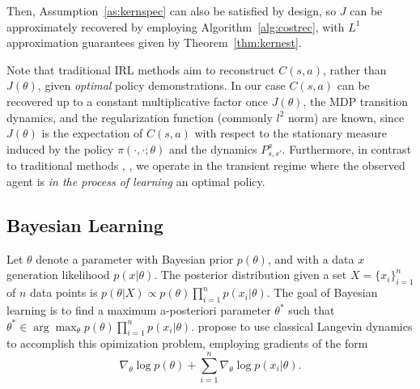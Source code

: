 \documentclass[journal,onecolumn]{IEEEtran}
\newcommand{\grad}{\nabla}
\newcommand{\rew}{J}
\begin{document}
{{\color{black} Then, Assumption~\ref{as:kernspec} can also be satisfied by design, so $\rew$ can be approximately recovered by employing Algorithm~\ref{alg:costrec}, with $L^1$ approximation guarantees given by Theorem~\ref{thm:kernest}.}

Note that traditional IRL methods aim to reconstruct $C(s,a)$, rather than $\rew(\theta)$, given \textit{optimal} policy demonstrations. In our case $C(s,a)$ can be recovered up to a constant multiplicative factor once $\rew(\theta)$, the MDP transition dynamics, {\color{black} and the regularization function (commonly $l^2$ norm)} are known, since $\rew(\theta)$ is the expectation of $C(s,a)$ with respect to the stationary measure induced by the policy $\pi(\cdot,\cdot;\theta)$ and the dynamics $P_{s,s'}^a$. Furthermore, in contrast to traditional methods \cite{ziebart2008maximum}, \cite{ng2000algorithms}, we operate in the transient regime where the observed agent is \textit{in the process of learning} an optimal policy.

\subsection{\textcolor{black} Bayesian Learning}
 Let $\theta$ denote a parameter with Bayesian prior $p(\theta)$, and with a data $x$ generation likelihood $p(x|\theta)$. The posterior distribution given a set $X = \{x_i\}_{i=1}^n$ of $n$ data points is $p(\theta | X) \propto p(\theta)\prod_{i=1}^n p(x_i|\theta)$. The goal of Bayesian learning is to find a maximum a-posteriori parameter $\theta^*$ such that $\theta^* \in \arg\max_{\theta} p(\theta)\prod_{i=1}^n p(x_i|\theta)$. \cite{welling2011bayesian} propose to use classical Langevin dynamics to accomplish this opimization problem, employing gradients of the form 
\[\grad_{\theta}\log p(\theta) + \sum_{i=1}^n \grad_{\theta}\log p(x_i | \theta).\]

}
\end{document}
